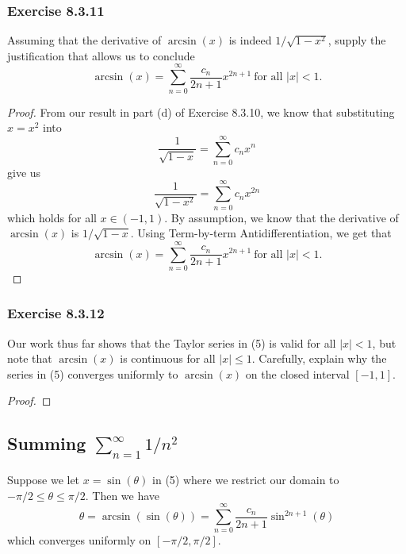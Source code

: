 \subsubsection{Exercise 8.3.11} Assuming that the derivative of \( \arcsin(x)  \) is indeed \( 1 / \sqrt{ 1 - x^{2} }  \), supply the justification that allows us to conclude 
\[  \arcsin(x) = \sum_{ n=0 }^{ \infty  } \frac{ c_{n}  }{  2n+1  } x^{2n+1} \ \text{for all }  | x  | < 1. \tag{5} \]
\begin{proof}
From our result in part (d) of Exercise 8.3.10, we know that substituting \( x  = x^{2} \) into 
\[  \frac{ 1 }{ \sqrt{ 1 - x  }  }  = \sum_{ n=0 }^{ \infty  } c_{n} x^{n}   \] give us 
\[  \frac{ 1  }{ \sqrt{ 1 -x^{2} }  } = \sum_{ n=0  }^{ \infty  } c_{n} x^{2n} \] which holds for all \( x \in (-1,1)\). By assumption, we know that the derivative of \( \arcsin(x)  \) is \( 1 / \sqrt{ 1 - x  }  \). Using Term-by-term Antidifferentiation, we get that 
\[  \arcsin(x) = \sum_{ n=0 }^{ \infty  } \frac{ c_{n}  }{ 2n+1  } x^{2n+1} \ \text{for all } |  x  | < 1.\]
\end{proof}

\subsubsection{Exercise 8.3.12} Our work thus far shows that the Taylor series in (5) is valid  for all \( |  x  |  < 1  \), but note that \( \arcsin(x)  \) is continuous for all \( |  x  | \leq 1   \). Carefully, explain why the series in (5) converges uniformly to \( \arcsin(x)  \) on the closed interval \( [-1,1] \).
\begin{proof}

\end{proof}


\subsection{Summing \( \sum_{ n=1 }^{ \infty  } 1 / n^{2} \)}

Suppose we let \( x = \sin( \theta ) \) in (5) where we restrict our domain to \( - \pi / 2 \leq \theta \leq \pi /2   \). Then we have
\[  \theta = \arcsin( \sin(\theta)) = \sum_{ n=0  }^{ \infty  } \frac{ c_{n}  }{ 2n+1 } \sin^{2n+1}(\theta) \] which converges uniformly on \( [-\pi/2 , \pi/2 ] \).

